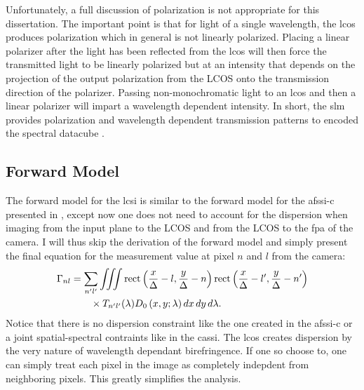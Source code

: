 



Unfortunately, a full discussion of polarization is not appropriate for this dissertation. The important point is that for light of a single wavelength, the \gls{lcos} produces polarization which in general is not linearly polarized. Placing a linear polarizer after the light has been reflected from the \gls{lcos} will then force the transmitted light to be linearly polarized but at an intensity that depends on the projection of the output polarization from the LCOS onto the transmission direction of the polarizer. Passing non-monochromatic light to an \gls{lcos} and then a linear polarizer will impart a wavelength dependent intensity. In short, the \gls{slm} provides polarization and wavelength dependent transmission patterns to encoded the spectral datacube \cite{tsai2015spatial}.

\subsection{Forward Model}

The forward model for the \gls{lcsi} is similar to the forward model for the \gls{afssi-c} presented in , except now one does not need to account for the dispersion when imaging from the input plane to the LCOS and from the LCOS to the \gls{fpa} of the camera. I will thus skip the derivation of the forward model and simply present the final equation for the measurement value at pixel $n$ and $l$ from the camera:
%
\begin{align} 
	\Gamma_{nl} &= \sum_{n^\prime l^\prime} \iiint \mbox{rect} \left( \frac{x}{\Delta} - l, \frac{y}{\Delta} - n \right) \mbox{rect} \left( \frac{x}{\Delta} - l^\prime , \frac{y}{\Delta} - n^\prime \right) \notag \\
 	&\qquad \times T_{n^\prime l^\prime} \ap{\lambda} D_0 \left( x, y; \lambda \right) dx \, dy \, d\lambda.
\end{align}
%
Notice that there is no dispersion constraint like the one created in the \gls{afssi-c} or a joint spatial-spectral contraints like in the \gls{cassi}. The \gls{lcos} creates dispersion by the very nature of wavelength dependant birefringence. If one so choose to, one can simply treat each pixel in the image as completely indepdent from neighboring pixels. This greatly simplifies the analysis. 

